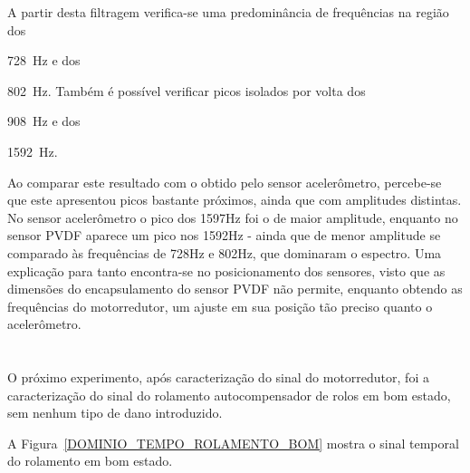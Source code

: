 \documentclass[
	12pt,				
	oneside,			
	a4paper,			
	english,			
	brazil,			
	]{abntex2ppgsi}
\begin{document}
{{{{{{{%

A partir desta filtragem verifica-se uma predominância de frequências na região dos {\SI{728}{\hertz} e dos {\SI{802}{\hertz}. Também é possível verificar picos isolados por volta dos {\SI{908}{\hertz} e dos {\SI{1592}{\hertz}.

Ao comparar este resultado com o obtido pelo sensor acelerômetro, percebe-se que este apresentou picos bastante próximos, ainda que com amplitudes distintas. No sensor acelerômetro o pico dos 1597Hz foi o de maior amplitude, enquanto no sensor PVDF aparece um pico nos 1592Hz - ainda que de menor amplitude se comparado às frequências de 728Hz e 802Hz, que dominaram o espectro. Uma explicação para tanto encontra-se no posicionamento dos sensores, visto que as dimensões do encapsulamento do sensor PVDF não permite, enquanto obtendo as frequências do motorredutor, um ajuste em sua posição tão preciso quanto o acelerômetro. 


\section{}

O próximo experimento, após caracterização do sinal do motorredutor, foi a caracterização do sinal do rolamento autocompensador de rolos em bom estado, sem nenhum tipo de dano introduzido. 

A Figura~\ref{DOMINIO_TEMPO_ROLAMENTO_BOM} mostra o sinal temporal do rolamento em bom estado. 

}}}}}}}}}}}
\end{document}
